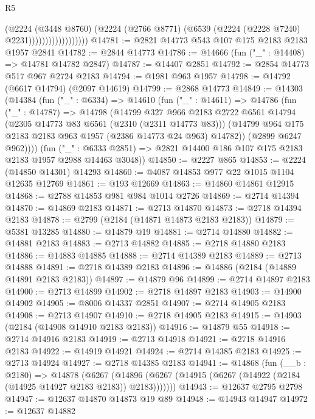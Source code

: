 \begin{lexlean}{R5}
\begin{coremodule}
                                (@2224
                                  (@3448 @8760)
                                  (@2224
                                    (@2766 @8771)
                                    (@6539 (@2224 (@2228 @7240) @2231))))))))))))))))))
@14781 := @2821 @14773 @543 @107 @175 @2183 @2183 @1957 @2841
@14782 := @2844 @14773
@14786 := @14666 (fun ("_" : @14408) => @14781 @14782 @2847)
@14787 := @14407 @2851
@14792 := @2854 @14773 @517 @967 @2724 @2183
@14794 := @1981 @963 @1957
@14798 := @14792 (@6617 @14794) (@2097 @14619)
@14799 := @2868 @14773
@14849 := @14303
    (@14384
      (fun ("_" : @6334) =>
      @14610
        (fun ("_" : @14611) =>
        @14786
          (fun ("_" : @14787) =>
          @14798
            (@14799
              @327
              @966
              @2183
              @2722
              @6561
              @14794
              (@2305 @14773 @83 @6561 (@2310 (@2311 @14773 @83)))
              (@14799 @964 @175 @2183 @2183 @963 @1957 (@2386 @14773 @24 @963) @14782))
            (@2899 @6247 @962))))
      (fun ("_" : @6333 @2851) => @2821 @14400 @186 @107 @175 @2183 @2183 @1957 @2988 @14463 @3048))
@14850 := @2227 @865
@14853 := @2224 (@14850 @14301) @14293
@14860 := @4087 @14853 @977 @22 @1015 @1104 @12635 @12769
@14861 := @193 @12669
@14863 := @14860 @14861 @12915
@14868 := @2788 @14853 @981 @984 @1014 @2726
@14869 := @2714 @14394
@14870 := @14869 @2183
@14871 := @2713 @14870
@14873 := @2718 @14394 @2183
@14878 := @2799 (@2184 (@14871 @14873 @2183 @2183))
@14879 := @5381 @13285
@14880 := @14879 @19
@14881 := @2714 @14880
@14882 := @14881 @2183
@14883 := @2713 @14882
@14885 := @2718 @14880 @2183
@14886 := @14883 @14885
@14888 := @2714 @14389 @2183
@14889 := @2713 @14888
@14891 := @2718 @14389 @2183
@14896 := @14886 (@2184 (@14889 @14891 @2183 @2183))
@14897 := @14879 @96
@14899 := @2714 @14897 @2183
@14900 := @2713 @14899
@14902 := @2718 @14897 @2183
@14903 := @14900 @14902
@14905 := @8006 @14337 @2851
@14907 := @2714 @14905 @2183
@14908 := @2713 @14907
@14910 := @2718 @14905 @2183
@14915 := @14903 (@2184 (@14908 @14910 @2183 @2183))
@14916 := @14879 @55
@14918 := @2714 @14916 @2183
@14919 := @2713 @14918
@14921 := @2718 @14916 @2183
@14922 := @14919 @14921
@14924 := @2714 @14385 @2183
@14925 := @2713 @14924
@14927 := @2718 @14385 @2183
@14941 := @14868
    (fun (__b : @2180) =>
    @14878
      (@6267 (@14896 (@6267 (@14915 (@6267 (@14922 (@2184 (@14925 @14927 @2183 @2183)) @2183)))))))
@14943 := @12637 @2795 @2798
@14947 := @12637 @14870 @14873 @19 @89
@14948 := @14943 @14947
@14972 := @12637
    @14882

\end{coremodule}
\end{lexlean}
